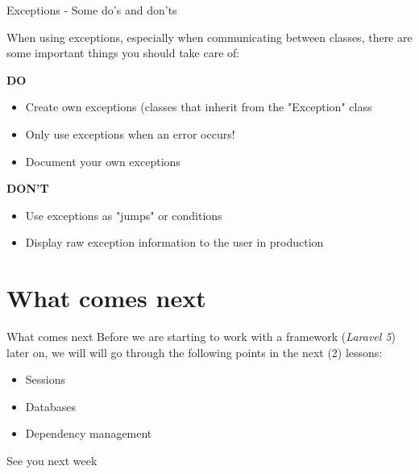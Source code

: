 \begin{frame}[fragile]{Exceptions - Some do's and don'ts}

When using exceptions, especially when communicating between classes, there are some important things you should take care of: \pause

\textbf{DO}
\begin{itemize}
\item Create own exceptions (classes that inherit from the "Exception" class \pause
\item Only use exceptions when an error occurs!\pause
\item Document your own exceptions\pause
\end{itemize}
\textbf{DON'T}\pause
\begin{itemize}
\item Use exceptions as "jumps" or conditions\pause
\item Display raw exception information to the user in production\pause
\end{itemize}
\end{frame}


\section{What comes next}

\begin{frame}[fragile]{What comes next}
Before we are starting to work with a framework (\emph{Laravel 5}) later on, we will will go through the following points in the next (2) lessons:
\begin{itemize}
\item Sessions \pause
\item Databases \pause
\item Dependency management \pause
\end{itemize}

See you next week
\end{frame}



